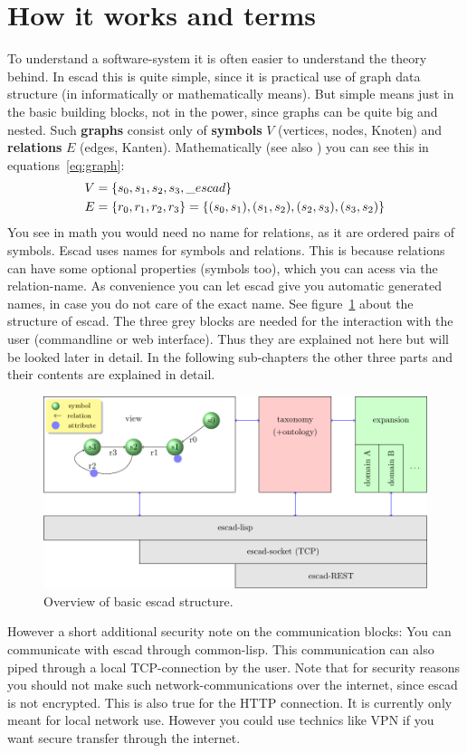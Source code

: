 \documentclass[a4paper, 12pt, openany]{scrbook}
\begin{document}
\section{How it works and terms}
To understand a software-system it is often easier to understand the theory behind. In escad this is quite simple, since it is practical use of graph data structure (in informatically or mathematically means). But simple means just in the basic building blocks, not in the power, since graphs can be quite big and nested. Such \textbf{graphs} consist only of \textbf{symbols} $V$ (vertices, nodes, Knoten) and \textbf{relations} $E$ (edges, Kanten). Mathematically (see also \cite{math:taschenbuchdermathematik}) you can see this in equations~\ref{eq:graph}:
\begin{align}
  \label{eq:graph}
  V & = \{s_0, s_1, s_2, s_3, \_escad\} \notag \\
  E & = \{r_0, r_1, r_2, r_3\} = \{(s_0, s_1), (s_1, s_2), (s_2, s_3), (s_3, s_2)\}
\end{align}
You see in math you would need no name for relations, as it are ordered pairs of symbols. Escad uses names for symbols and relations. This is because relations can have some optional properties (symbols too), which you can acess via the relation-name. As convenience you can let escad give you automatic generated names, in case you do not care of the exact name.
See figure~\ref{fig:overview} about the structure of escad. The three grey blocks are needed for the interaction with the user (commandline or web interface). Thus they are explained not here but will be looked later in detail. In the following sub-chapters the other three parts and their contents are explained in detail.
\begin{figure}[htbp]
  \centering
  \includegraphics{figures/overview.pdf}
  \caption{Overview of basic escad structure.}
  \label{fig:overview}
\end{figure}
However a short additional security note on the communication blocks: You can communicate with escad through common-lisp. This communication can also piped through a local TCP-connection by the user. Note that for security reasons you should not make such network-communications over the internet, since escad is not encrypted. This is also true for the HTTP connection. It is currently only meant for local network use. However you could use technics like VPN if you want secure transfer through the internet.
\end{document}
